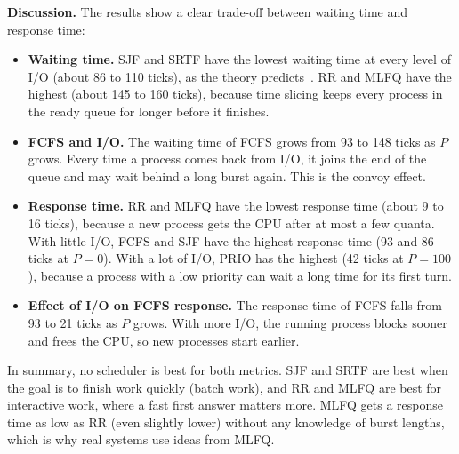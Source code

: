 \textbf{Discussion.} The results show a clear trade-off between waiting time and response time:
\begin{itemize}
    \item \textbf{Waiting time.} SJF and SRTF have the lowest waiting time at every level of I/O (about 86 to 110 ticks), as the theory predicts~\cite[Sec.~5.3.2]{silberschatz}. RR and MLFQ have the highest (about 145 to 160 ticks), because time slicing keeps every process in the ready queue for longer before it finishes.
    \item \textbf{FCFS and I/O.} The waiting time of FCFS grows from 93 to 148 ticks as $P$ grows. Every time a process comes back from I/O, it joins the end of the queue and may wait behind a long burst again. This is the convoy effect.
    \item \textbf{Response time.} RR and MLFQ have the lowest response time (about 9 to 16 ticks), because a new process gets the CPU after at most a few quanta. With little I/O, FCFS and SJF have the highest response time (93 and 86 ticks at $P=0$). With a lot of I/O, PRIO has the highest (42 ticks at $P=100$), because a process with a low priority can wait a long time for its first turn.
    \item \textbf{Effect of I/O on FCFS response.} The response time of FCFS falls from 93 to 21 ticks as $P$ grows. With more I/O, the running process blocks sooner and frees the CPU, so new processes start earlier.
\end{itemize}
In summary, no scheduler is best for both metrics. SJF and SRTF are best when the goal is to finish work quickly (batch work), and RR and MLFQ are best for interactive work, where a fast first answer matters more. MLFQ gets a response time as low as RR (even slightly lower) without any knowledge of burst lengths, which is why real systems use ideas from MLFQ.

